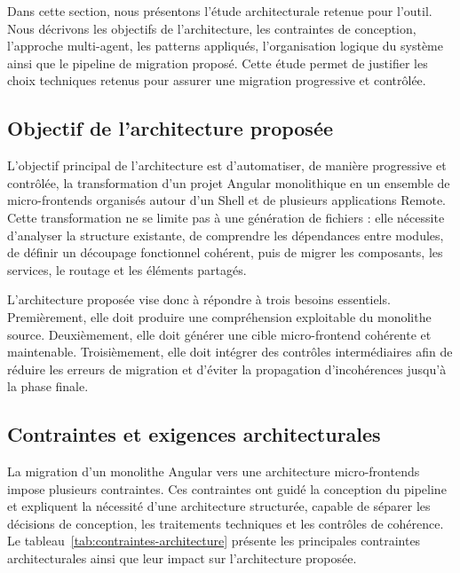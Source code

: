 Dans cette section, nous présentons l'étude architecturale retenue pour l'outil. Nous décrivons les objectifs de l'architecture, les contraintes de conception, l'approche multi-agent, les patterns appliqués, l'organisation logique du système ainsi que le pipeline de migration proposé. Cette étude permet de justifier les choix techniques retenus pour assurer une migration progressive et contrôlée.

\subsection{Objectif de l'architecture proposée}

L'objectif principal de l'architecture est d'automatiser, de manière progressive et contrôlée, la transformation d'un projet Angular monolithique en un ensemble de micro-frontends organisés autour d'un Shell et de plusieurs applications Remote. Cette transformation ne se limite pas à une génération de fichiers : elle nécessite d'analyser la structure existante, de comprendre les dépendances entre modules, de définir un découpage fonctionnel cohérent, puis de migrer les composants, les services, le routage et les éléments partagés.

L'architecture proposée vise donc à répondre à trois besoins essentiels. Premièrement, elle doit produire une compréhension exploitable du monolithe source. Deuxièmement, elle doit générer une cible micro-frontend cohérente et maintenable. Troisièmement, elle doit intégrer des contrôles intermédiaires afin de réduire les erreurs de migration et d'éviter la propagation d'incohérences jusqu'à la phase finale.

\subsection{Contraintes et exigences architecturales}

La migration d'un monolithe Angular vers une architecture micro-frontends impose plusieurs contraintes. Ces contraintes ont guidé la conception du pipeline et expliquent la nécessité d'une architecture structurée, capable de séparer les décisions de conception, les traitements techniques et les contrôles de cohérence. Le tableau~\ref{tab:contraintes-architecture} présente les principales contraintes architecturales ainsi que leur impact sur l'architecture proposée.

